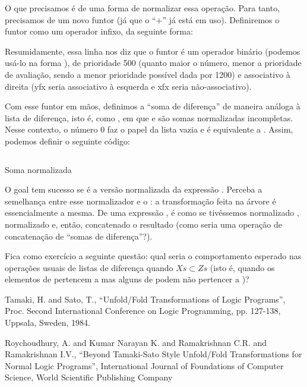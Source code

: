 \documentclass{article}
\begin{document}
O que precisamos é de uma forma de normalizar essa operação. Para
tanto, precisamos de um novo funtor (já que o ``+'' já está em
uso). Definiremos o funtor  como um operador infixo, da
seguinte forma:


\noindent Resumidamente, essa linha nos diz que o funtor 
é um operador binário (podemos usá-lo na forma ), de
prioridade 500 (quanto maior o número, menor a prioridade de
avaliação, sendo a menor prioridade possível dada por 1200) e
associativo à direita (yfx seria associativo à esquerda e xfx seria
não-associativo).

Com esse funtor em mãos, definimos a ``soma de diferença'' de maneira
análoga à lista de diferença, isto é, como , em que
 e  são somas normalizadas incompletas. Nesse
contexto, o número 0 faz o papel da lista vazia e  é
equivalente a . Assim, podemos definir o seguinte código:

    \begin{listing}
\inputminted{prolog}{../Exemplos/Cap3/progn_normalized_sum.pl}
\caption{Soma normalizada}\label{lst:norm}
    \end{listing}

\noindent O goal  tem sucesso se
 é a versão normalizada da expressão .  Perceba a
semelhança entre esse normalizador e o : a
transformação feita na árvore é essencialmente a mesma. De uma
expressão , é como se tivéssemos normalizado ,
normalizado  e, então, concatenado o resultado (como seria uma
operação de concatenação de ``somas de diferença''?).

Fica como exercício a seguinte questão: qual seria o comportamento
esperado nas operações usuais de listas de diferença
 quando $Xs \subset Zs$ (isto é, quando os
elementos de  pertencem a  mas alguns de 
podem não pertencer a )?

\begin{thebibliography}{1}

 Tamaki, H. and Sato, T., ``Unfold/Fold
  Transformations of Logic Programs'', Proc. Second International
  Conference on Logic Programming, pp. 127-138, Uppsala, Sweden,
  1984.

 Roychoudhury, A. and Kumar Narayan K. and
  Ramakrishnan C.R. and Ramakrishnan I.V., ``Beyond Tamaki-Sato
  Style Unfold/Fold Transformations for Normal Logic Programs'',
  International Journal of Foundations of Computer Science, World
  Scientific Publishing Company

\end{thebibliography}
\end{document}
